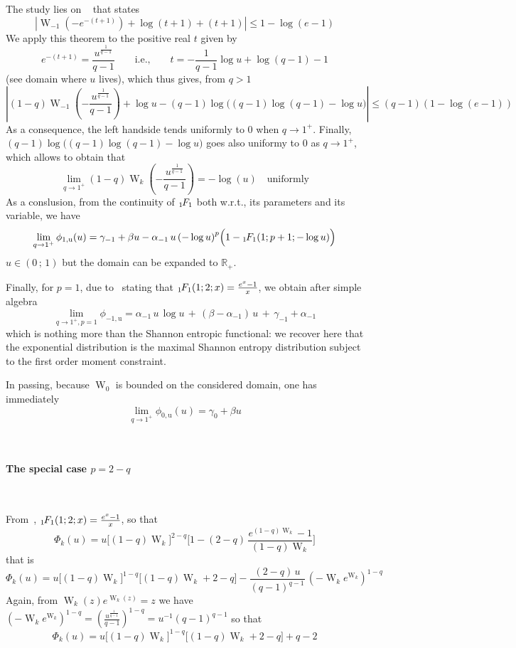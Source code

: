 \documentclass[entropy,article,submit,moreauthors,pdftex]{Definitions/mdpi}
\newcommand{\jfb}[1]{{\color{red} #1}}                                       %
\def\Rset{\mathbb{R}}%
\def\W{\operatorname{W}} %
\newcommand{\hypgeom}[2]{\mbox{}_{#1}\hspace{-1pt}F_{#2}}%
\def\u{\mathrm{u}}
\begin{document}
The study lies on ~\cite[Th.~3.2]{AlzSal18} that states
%
\[
\left| \W_{-1}\left( - e^{-(t+1)} \right) + \log(t+1) + (t+1) \right| \le 1 - \log(e-1)
\]
%
We apply this theorem to the positive real $t$ given by
%
\[
e^{-(t+1)}  =  \frac{u^{\frac{1}{q-1}}}{q-1}  \qquad  \mbox{i.e.,}  \qquad  t  =
-\frac{1}{q-1} \log u + \log(q-1) - 1
\]
%
(see domain where $u$ lives), which thus gives, from $q > 1$
%
\[
\left| (1-q)  \W_{-1}\left( - \frac{u^{\frac{1}{q-1}}}{q-1}  \right) + \log  u -
(q-1)  \log  \Big( (q-1)  \log(q-1)  -  \log u  \Big)  \right|  \le (q-1)  (1  -
\log(e-1))
\]
%
As  a  consequence,  the  left  handside  tends  uniformly  to  0  when  $q  \to
1^+$. Finally, \jfb{$(q-1) \log \Big( (q-1)  \log(q-1) - \log u \Big)$ goes also
  uniformy to 0 as $q \to 1^+$}, which allows to obtain that
%
\[
\lim_{q \to  1^+} (1-q) \W_k\left(  - \frac{u^{\frac{1}{q-1}}}{q-1} \right)  = -
\log(u) \quad \mbox{uniformly}
\]
%
As  a conslusion,  \jfb{from the  continuity of  $\hypgeom{1}{1}$ both  w.r.t., its
parameters and its variable}, we have
%
\[
\lim_{q \to 1^+}  \phi_{1,\u}(u) = \gamma_{-1} +  \beta u - \alpha_{-1}  \, u \,
\left( - \log u \right)^p \Big(1 - \hypgeom{1}{1}( 1 ; p+1 ; - \log u) \Big)
\]
%
$u \in ( 0 \, ; \, 1)$ but the domain can be expanded to $\Rset_+$.

Finally,   for   $p  =   1$,   due   to~\cite[13.6.14]{AbrSte70}  stating   that
$\hypgeom{1}{1}(1 ; 2 ; x) = \frac{e^x - 1}{x}$, we obtain after simple algebra
%
\[
\lim_{q  \to  1^+,p=1} \phi_{-1,\u}  =  \alpha_{-1}  \, u  \,  \log  u \,  +  \,
(\beta-\alpha_{-1}) \, u \, + \, \gamma_{-1}+\alpha_{-1}
\]
%
which is nothing more than the Shannon entropic functional: we recover here that
the exponential distribution is the maximal Shannon entropy distribution subject
to the first order moment constraint.

In  passing,  because $\W_0$  is  bounded  on  the  considered domain,  one  has
immediately
%
\[
\lim_{q \to 1^+}  \phi_{0,\u}(u) = \gamma_0 +  \beta u
\]


\

\paragraph{\bf The special case $p = 2-q$}

\

From~\cite[13.6.14]{AbrSte70}, $\hypgeom{1}{1}(1 ; 2 ; x) = \frac{e^x - 1}{x}$, so that
%
\[
\Phi_k(u) =  u \Big[ (1-q)  \W_k \Big]^{2-q} \Big[  1 - (2-q)  \, \frac{e^{(1-q)
      \W_k} - 1}{(1-q) \W_k} \Big]
\]
%
that is
%
\[
\Phi_k(u) =  u \Big[ (1-q)  \W_k \Big]^{1-q} \Big[  (1-q) \W_k +  2 - q  \Big] -
\frac{(2-q) \, u}{(q-1)^{q-1}} \, \left( - \W_k e^{\W_k} \right)^{1-q}
\]
%
Again,  from  $\W_k(z)  e^{\W_k(z)}  =  z$  we  have  $\left(  -  \W_k  e^{\W_k}
\right)^{1-q}  =  \left(  \frac{u^{\frac{1}{q-1}}}{q-1} \right)^{1-q}  =  u^{-1}
(q-1)^{q-1}$ so that
%
\[
\Phi_k(u) = u \Big[ (1-q) \W_k \Big]^{1-q} \Big[ (1-q) \W_k + 2 - q \Big] + q - 2
\]
\end{document}
